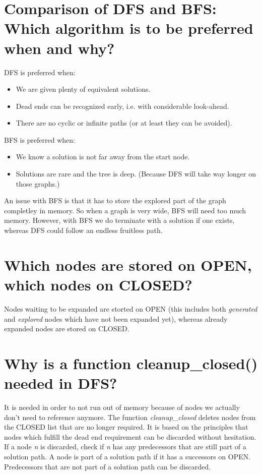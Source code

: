 \documentclass[12pt, a4paper]{article}
\begin{document}
\section{Comparison of DFS and BFS: Which algorithm is to be preferred when and why?}
DFS is preferred when:
\begin{itemize}
\item We are given plenty of equivalent solutions.
\item Dead ends can be recognized early, i.e. with considerable look-ahead.
\item There are no cyclic or infinite paths (or at least they can be avoided).
\end{itemize}
BFS is preferred when:
\begin{itemize}
\item We know a solution is not far away from the start node.
\item Solutions are rare and the tree is deep. (Because DFS will take way longer on those graphs.)
\end{itemize}
An issue with BFS is that it has to store the explored part of the graph completley in memory. So when a graph is very wide, BFS will need too much memory. However, with BFS we do terminate with a solution if one exists, whereas DFS could follow an endless fruitless path.

\section{Which nodes are stored on OPEN, which nodes on CLOSED?}
Nodes waiting to be expanded are storted on OPEN (this includes both \textit{generated} and \textit{explored} nodes which have not been expanded yet), whereas already expanded nodes are stored on CLOSED.

\section{Why is a function cleanup\_closed() needed in DFS?}
It is needed in order to not run out of memory because of nodes we actually don't need to reference anymore. The function \textit{cleanup\_closed} deletes nodes from the CLOSED list that are no longer required. It is based on the principles that nodes which fulfill the dead end requirement can be discarded without hesitation. If a node \textit{n} is discarded, check if  \textit{n} has any predecessors that are still part of a solution path. A node is part of a solution path if it has a successors on OPEN. Predecessors that are not part of a solution path can be discarded.
\end{document}
